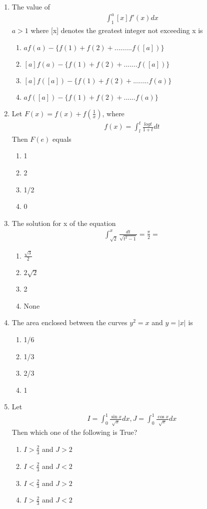 \begin{enumerate}[label=\arabic*.,ref=\thesubsection.\theenumi]
\item The value of
\begin{align*}
\int_{1}^{a}[x]f'(x)dx
\end{align*}
$a > 1$ where [x] denotes the greatest integer not exceeding x is
\begin{enumerate}
\item $af(a) - \{f(1) + f(2) +.........f([a])\}$
\item $[a]f(a) - \{f(1) + f(2) +.......f([a])\}$
\item $[a]f([a]) - \{f(1) + f(2) +........f(a)\}$
\item $af([a]) - \{f(1) + f(2) + ......f(a)\}$
\end{enumerate}

\item Let $F(x) = f(x) + f(\frac{1}{x})$, where
\begin{align*}
f(x) = \int_{l}^{t}\frac{logt}{1 + t}dt
\end{align*}
Then $F(e)$ equals
\begin{enumerate}
\item 1
\item 2
\item 1/2
\item 0
\end{enumerate}

\item The solution for x of the equation
\begin{align*}
\int_{\sqrt{2}}^{x}\frac{dt}{\sqrt{t^2 - 1}} = \frac{\pi}{2} = 
\end{align*}
\begin{enumerate}
\item $\frac{\sqrt{3}}{2}$
\item $2\sqrt{2}$
\item 2
\item None
\end{enumerate}

\item The area enclosed between the curves $y^2 = x$ and $y = |x|$ is
\begin{enumerate}
\item 1/6
\item 1/3
\item 2/3
\item 1
\end{enumerate}

\item Let
\begin{align*}
I = \int_{0}^{1}\frac{\sin x}{\sqrt{x}}dx, J = \int_{0}^{1}\frac{\cos x}{\sqrt{x}}dx 
\end{align*}
Then which one of the following is True?
\begin{enumerate}
\item $I > \frac{2}{3}$ and $J > 2$
\item $I < \frac{2}{3}$ and $J < 2$
\item $I < \frac{2}{3}$ and $J > 2$
\item $I > \frac{2}{3}$ and $J < 2$
\end{enumerate}


\end{enumerate}
